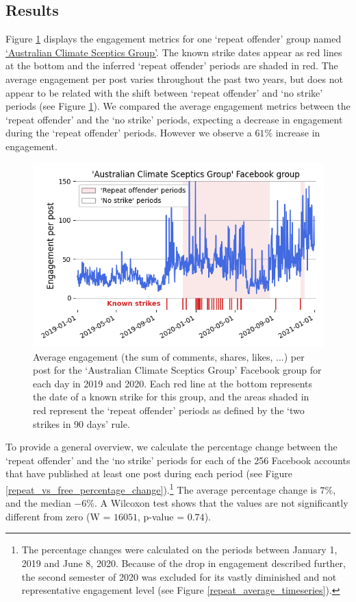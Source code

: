 \documentclass[11pt,a4paper]{article}
\begin{document}
\subsection{Results}

Figure \ref{repeat_example_timeseries} displays the engagement metrics for one `repeat offender' group named \href{https://www.facebook.com/groups/108655705888371/}{`Australian Climate Sceptics Group'}. 
The known strike dates appear as red lines at the bottom and the inferred ‘repeat offender’ periods are shaded in red. 
The average engagement per post varies throughout the past two years, but does not appear to be related with the shift between `repeat offender' and `no strike' periods (see Figure \ref{repeat_example_timeseries}).
We compared the average engagement metrics between the `repeat offender' and the `no strike' periods, expecting a decrease in engagement during the `repeat offender' periods. 
However we observe a $61\%$ increase in engagement.

\begin{figure}[!h]
\centering
\includegraphics[width=\linewidth]{./../figure/repeat_example_timeseries.png}
\caption{Average engagement (the sum of comments, shares, likes, ...) per post for the `Australian Climate Sceptics Group' Facebook group for each day in 2019 and 2020. Each red line at the bottom represents the date of a known strike for this group, and the areas shaded in red represent the `repeat offender' periods as defined by the ‘two strikes in 90 days’ rule.}
\label{repeat_example_timeseries}
\end{figure}

To provide a general overview, we calculate the percentage change between the `repeat offender' and the `no strike' periods for each of the 256 Facebook accounts that have published at least one post during each period (see Figure \ref{repeat_vs_free_percentage_change}).\footnote{The percentage changes were calculated on the periods between January 1, 2019 and June 8, 2020. Because of the drop in engagement described further, the second semester of 2020 was excluded for its vastly diminished and not representative engagement level (see Figure \ref{repeat_average_timeseries}).}
The average percentage change is $7\%$, and the median $-6\%$. 
A Wilcoxon test shows that the values are not significantly different from zero (W = $16051$, p-value = $0.74$).
\end{document}
